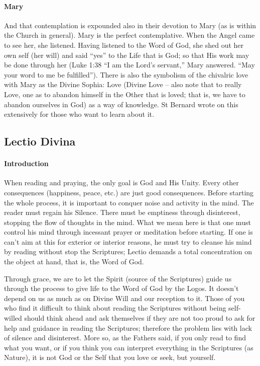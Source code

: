 \paragraph{Mary}
And that contemplation is expounded also in their devotion to Mary (as is within the Church in general). Mary is the perfect contemplative. When the Angel came to see her, she listened. Having listened to the Word of God, she shed out her own self (her will) and said ``yes” to the Life that is God; so that His work may be done through her (Luke 1:38 “I am the Lord's servant,” Mary answered. “May your word to me be fulfilled”). There is also the symbolism of the chivalric love with Mary as the Divine Sophia: Love (Divine Love – also note that to really Love, one as to abandon himself in the Other that is loved; that is, we have to abandon ourselves in God) as a way of knowledge. St Bernard wrote on this extensively for those who want to learn about it.

\subsection*{Lectio Divina}

\paragraph{Introduction}
When reading and praying, the only goal is God and His Unity. Every other consequences (happiness, peace, etc.) are just good consequences. Before starting the whole process, it is important to conquer noise and activity in the mind. The reader must regain his Silence. There must be emptiness through disinterest, stopping the flow of thoughts in the mind. What we mean here is that one must control his mind through incessant prayer or meditation before starting. If one is can't aim at this for exterior or interior reasons, he must try to cleanse his mind by reading without stop the Scriptures; Lectio demands a total concentration on the object at hand, that is, the Word of God.

Through grace, we are to let the Spirit (source of the Scriptures) guide us through the process to give life to the Word of God by the Logos. It doesn't depend on us as much as on Divine Will and our reception to it. Those of you who find it difficult to think about reading the Scriptures without being self-willed should think ahead and ask themselves if they are not too proud to ask for help and guidance in reading the Scriptures; therefore the problem lies with lack of silence and disinterest. More so, as the Fathers said, if you only read to find what you want, or if you think you can interpret everything in the Scriptures (as Nature), it is not God or the Self that you love or seek, but yourself.

